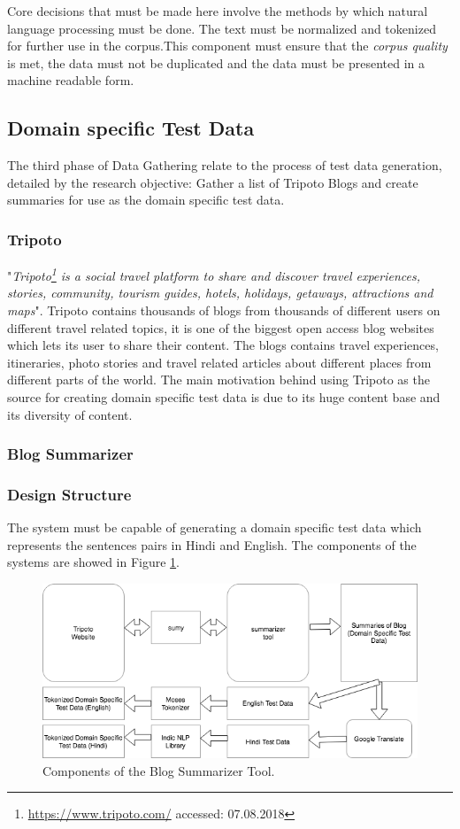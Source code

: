 Core decisions that must be made here involve the methods by which natural language processing must be done. The text must be normalized and tokenized for further use in the corpus.This component must ensure that the \textit{corpus quality} is met, the data must not be duplicated and the data must be presented in a machine readable form.

\subsection{Domain specific Test Data}
The third phase of Data Gathering relate to the process of test data generation, detailed by the research objective: Gather a list of Tripoto Blogs and create summaries for use as the domain specific test data.
\subsubsection{Tripoto}
"\textit{Tripoto\footnote{\url{https://www.tripoto.com/} accessed: 07.08.2018} is a social travel platform to share and discover  travel experiences, stories, community, tourism guides, hotels, holidays, getaways, attractions and maps}"\citep{tripoto}.  Tripoto contains thousands of blogs from thousands of different users on different travel related topics, it is one of the biggest open access blog websites which lets its user to share their content. The blogs contains travel experiences, itineraries, photo stories and travel related articles about different places from different parts of the world. The main motivation behind using Tripoto as the source for creating domain specific test data is due to its huge content base and its diversity of content. 
\subsubsection{Blog Summarizer}
\subsubsection{Design Structure}
The system must be capable of generating a domain specific test data which represents the sentences pairs in Hindi and English. The components of the systems are showed in Figure \ref{summarizer}.

\begin{figure}[h]
\includegraphics[width=\textwidth]{figures/design4.png}
\caption{Components of the Blog Summarizer Tool.} \label{summarizer}
\end{figure}

